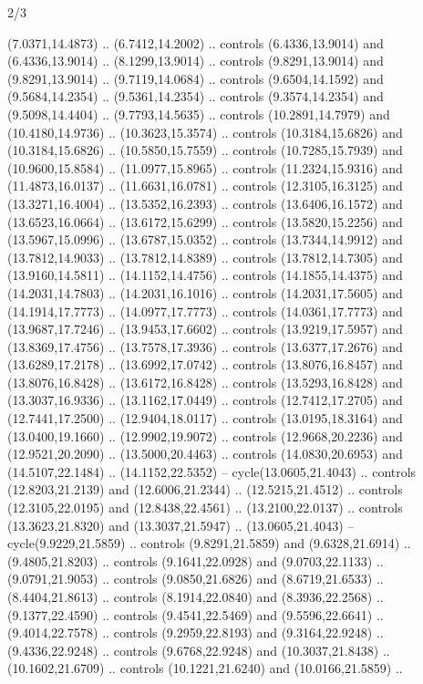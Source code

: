 \begin{flagdescription}{2/3}
\begin{scope}[yshift=\flagwidth,scale=\flagwidth/1241.93737]
\begin{scope}[y=-1mm, x=1mm,draw=gold,fill=blue,line join=miter,miter limit=4,line width=1.8\lw]
{  (7.0371,14.4873) .. (6.7412,14.2002) .. controls (6.4336,13.9014) and
  (6.4336,13.9014) .. (8.1299,13.9014) .. controls (9.8291,13.9014) and
  (9.8291,13.9014) .. (9.7119,14.0684) .. controls (9.6504,14.1592) and
  (9.5684,14.2354) .. (9.5361,14.2354) .. controls (9.3574,14.2354) and
  (9.5098,14.4404) .. (9.7793,14.5635) .. controls (10.2891,14.7979) and
  (10.4180,14.9736) .. (10.3623,15.3574) .. controls (10.3184,15.6826) and
  (10.3184,15.6826) .. (10.5850,15.7559) .. controls (10.7285,15.7939) and
  (10.9600,15.8584) .. (11.0977,15.8965) .. controls (11.2324,15.9316) and
  (11.4873,16.0137) .. (11.6631,16.0781) .. controls (12.3105,16.3125) and
  (13.3271,16.4004) .. (13.5352,16.2393) .. controls (13.6406,16.1572) and
  (13.6523,16.0664) .. (13.6172,15.6299) .. controls (13.5820,15.2256) and
  (13.5967,15.0996) .. (13.6787,15.0352) .. controls (13.7344,14.9912) and
  (13.7812,14.9033) .. (13.7812,14.8389) .. controls (13.7812,14.7305) and
  (13.9160,14.5811) .. (14.1152,14.4756) .. controls (14.1855,14.4375) and
  (14.2031,14.7803) .. (14.2031,16.1016) .. controls (14.2031,17.5605) and
  (14.1914,17.7773) .. (14.0977,17.7773) .. controls (14.0361,17.7773) and
  (13.9687,17.7246) .. (13.9453,17.6602) .. controls (13.9219,17.5957) and
  (13.8369,17.4756) .. (13.7578,17.3936) .. controls (13.6377,17.2676) and
  (13.6289,17.2178) .. (13.6992,17.0742) .. controls (13.8076,16.8457) and
  (13.8076,16.8428) .. (13.6172,16.8428) .. controls (13.5293,16.8428) and
  (13.3037,16.9336) .. (13.1162,17.0449) .. controls (12.7412,17.2705) and
  (12.7441,17.2500) .. (12.9404,18.0117) .. controls (13.0195,18.3164) and
  (13.0400,19.1660) .. (12.9902,19.9072) .. controls (12.9668,20.2236) and
  (12.9521,20.2090) .. (13.5000,20.4463) .. controls (14.0830,20.6953) and
  (14.5107,22.1484) .. (14.1152,22.5352) -- cycle(13.0605,21.4043) .. controls
  (12.8203,21.2139) and (12.6006,21.2344) .. (12.5215,21.4512) .. controls
  (12.3105,22.0195) and (12.8438,22.4561) .. (13.2100,22.0137) .. controls
  (13.3623,21.8320) and (13.3037,21.5947) .. (13.0605,21.4043) --
  cycle(9.9229,21.5859) .. controls (9.8291,21.5859) and (9.6328,21.6914) ..
  (9.4805,21.8203) .. controls (9.1641,22.0928) and (9.0703,22.1133) ..
  (9.0791,21.9053) .. controls (9.0850,21.6826) and (8.6719,21.6533) ..
  (8.4404,21.8613) .. controls (8.1914,22.0840) and (8.3936,22.2568) ..
  (9.1377,22.4590) .. controls (9.4541,22.5469) and (9.5596,22.6641) ..
  (9.4014,22.7578) .. controls (9.2959,22.8193) and (9.3164,22.9248) ..
  (9.4336,22.9248) .. controls (9.6768,22.9248) and (10.3037,21.8438) ..
  (10.1602,21.6709) .. controls (10.1221,21.6240) and (10.0166,21.5859) ..
}
\end{scope}
\end{scope}
\end{flagdescription}
